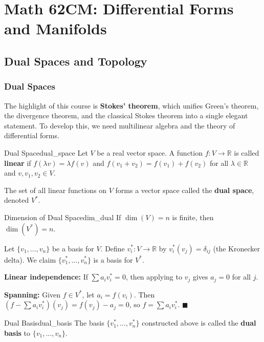 \documentclass[11pt, letterpaper, openany]{book}
\renewenvironment{proof}[1][\proofname]{%
  \tcolorbox[blanker, breakable, left=1em,
    before skip=1em, after skip=1em,
    borderline west={2pt}{0pt}{MagicTeal!50},
    colback=MagicCream,
    before upper={\textcolor{MagicTeal}{\sffamily\bfseries #1.}\space}
  ]%
}{%
  \hfill\textcolor{MagicTeal}{\ensuremath{\blacksquare}}\endtcolorbox%
}
\begin{document}
\part{Math 62CM: Differential Forms and Manifolds}

\setcounter{chapter}{0}

\chapter{Dual Spaces and Topology}

\section{Dual Spaces}

The highlight of this course is \textbf{Stokes' theorem}, which unifies Green's theorem, the divergence theorem, and the classical Stokes theorem into a single elegant statement. To develop this, we need multilinear algebra and the theory of differential forms.

\begin{defn}{Dual Space}{dual_space}
Let $V$ be a real vector space. A function $f: V \to \mathbb{R}$ is called \textbf{linear} if $f(\lambda v) = \lambda f(v)$ and $f(v_1 + v_2) = f(v_1) + f(v_2)$ for all $\lambda \in \mathbb{R}$ and $v, v_1, v_2 \in V$.

The set of all linear functions on $V$ forms a vector space called the \textbf{dual space}, denoted $V^*$.
\end{defn}

\begin{thm}{Dimension of Dual Space}{dim_dual}
If $\dim(V) = n$ is finite, then $\dim(V^*) = n$.
\end{thm}

\begin{proof}
Let $\{v_1, \ldots, v_n\}$ be a basis for $V$. Define $v_i^*: V \to \mathbb{R}$ by $v_i^*(v_j) = \delta_{ij}$ (the Kronecker delta). We claim $\{v_1^*, \ldots, v_n^*\}$ is a basis for $V^*$.

\textbf{Linear independence:} If $\sum a_i v_i^* = 0$, then applying to $v_j$ gives $a_j = 0$ for all $j$.

\textbf{Spanning:} Given $f \in V^*$, let $a_i = f(v_i)$. Then $(f - \sum a_i v_i^*)(v_j) = f(v_j) - a_j = 0$, so $f = \sum a_i v_i^*$.
\end{proof}

\begin{defn}{Dual Basis}{dual_basis}
The basis $\{v_1^*, \ldots, v_n^*\}$ constructed above is called the \textbf{dual basis} to $\{v_1, \ldots, v_n\}$.
\end{defn}
\end{document}

